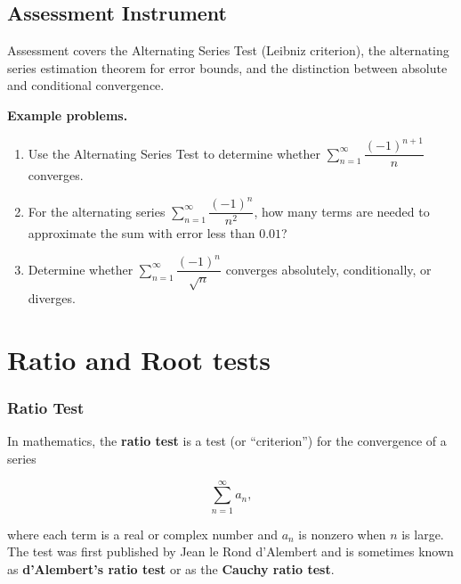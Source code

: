 \subsection{Assessment Instrument}
\label{ssec:alte-69b6}

Assessment covers the Alternating Series Test (Leibniz criterion), the alternating series estimation theorem for error bounds, and the distinction between absolute and conditional convergence.

\textbf{Example problems.}

\begin{enumerate}
    \item Use the Alternating Series Test to determine whether $\sum_{n=1}^{\infty}\dfrac{(-1)^{n+1}}{n}$ converges.
    \item For the alternating series $\sum_{n=1}^{\infty}\dfrac{(-1)^n}{n^2}$, how many terms are needed to approximate the sum with error less than $0.01$?
    \item Determine whether $\sum_{n=1}^{\infty}\dfrac{(-1)^n}{\sqrt{n}}$ converges absolutely, conditionally, or diverges.
\end{enumerate}

\section{Ratio and Root tests}
\label{sec:rati-81b0}


\subsubsection{Ratio Test}
\label{sss:rati-a950}


In mathematics, the \textbf{ratio test} is a test (or ``criterion'') for the convergence of a series


\[
\sum _{n=1}^\infty a_n,
\]


where each term is a real or complex number and $a_n$ is nonzero when $n$ is large. The test was first published by Jean le Rond d'Alembert and is sometimes known as \textbf{d'Alembert's ratio test} or as the \textbf{Cauchy ratio test}.


